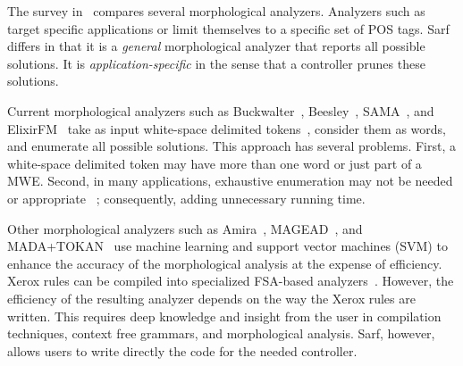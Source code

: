 \documentclass[11pt]{article}
\begin{document}
The survey in~\cite{Sughaiyer:04} compares
several morphological analyzers. 
Analyzers such as~\cite{Khoja:01,Darwish:02} 
target specific applications 
or limit themselves to a specific set of POS tags. 
Sarf differs in that it is a {\em general} morphological 
analyzer that reports all possible solutions. 
It is {\em application-specific} in the sense that a controller 
prunes these solutions. 

Current morphological analyzers such as %
Buckwalter~,
Beesley~,
SAMA~\cite{Kulick:10},
and ElixirFM~\cite{Otakar:07} 
take as input white-space delimited tokens~\cite{Kulick:10},
consider them as words,
and enumerate all possible solutions. 
This approach has several problems. 
First, a white-space delimited token may have 
more than one word or just part of a MWE.
Second, in many applications, exhaustive enumeration may not be needed or appropriate
~\cite{Maamouri:10}; consequently, adding unnecessary running time.

Other morphological analyzers such as 
Amira~\cite{Diab:07,Benajiba:07},
MAGEAD~\cite{Habash:05}, and MADA+TOKAN~\cite{Habash:09} 
use machine learning and support vector machines (SVM) 
to enhance the accuracy of the morphological analysis at the expense 
of efficiency.
Xerox rules can be compiled into specialized 
FSA-based analyzers~\cite{Beesley:03}.
However, the efficiency of the resulting analyzer depends on the
way the Xerox rules are written. 
This requires deep knowledge and insight from the user
in compilation techniques, context free grammars, 
and morphological analysis.
Sarf, however, allows users to write directly the code for the needed controller. %
\end{document}
